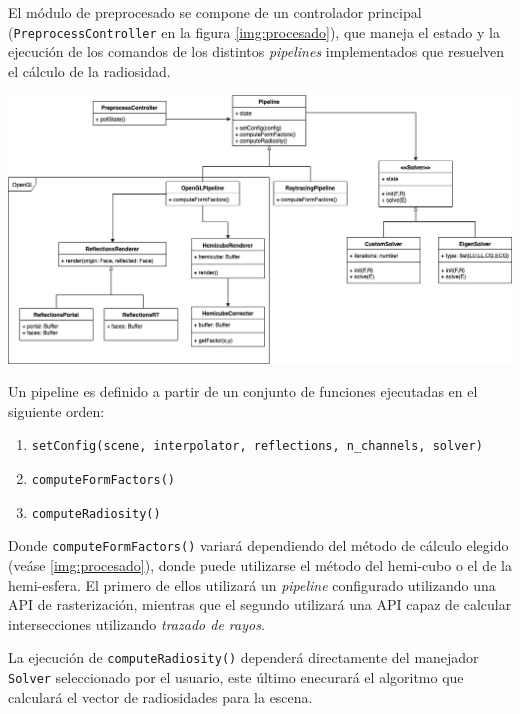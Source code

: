 El módulo de preprocesado se compone de un controlador principal (\verb|PreprocessController| en la figura \ref{img:procesado}), que maneja el estado y la ejecución de  los comandos de los distintos \textit{pipelines} implementados que resuelven el cálculo de la radiosidad.

\vspace{5mm}
\begin{minipage}[h]{\linewidth}
	\centering
	\includegraphics[width=\linewidth]{assets/preprocess}
	\label{img:procesado}
\end{minipage}

Un pipeline es definido a partir de un conjunto de funciones ejecutadas en el siguiente orden:

\begin{enumerate}
	\item \verb|setConfig(scene, interpolator, reflections, n_channels, solver)|
	\item \verb|computeFormFactors()|
	\item \verb|computeRadiosity()|
\end{enumerate}

Donde \verb|computeFormFactors()| variará dependiendo del método de cálculo elegido (veáse \ref{img:procesado}), donde puede utilizarse el método del hemi-cubo o el de la hemi-esfera. El primero de ellos utilizará un \textit{pipeline} configurado utilizando una API de rasterización, mientras que el segundo utilizará una API capaz de calcular intersecciones utilizando \textit{trazado de rayos}.

La ejecución de \verb|computeRadiosity()| dependerá directamente del manejador \verb|Solver| seleccionado por el usuario, este último enecurará el algoritmo que calculará el vector de radiosidades para la escena.

